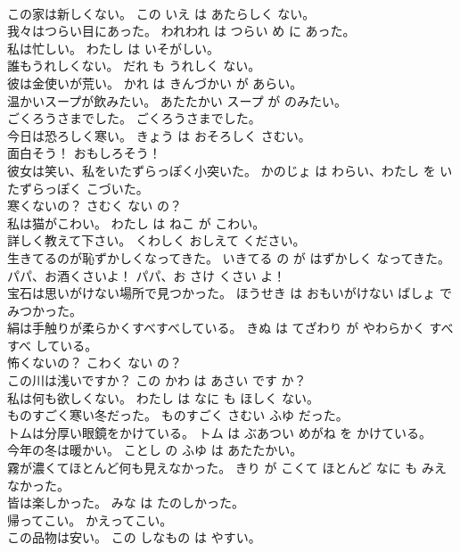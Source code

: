 \documentclass[8pt]{extreport}
\begin{document}
\begin{CJK}{UTF8}{min}
\\	この家は新しくない。	この いえ は あたらしく ない。	
\\	我々はつらい目にあった。	われわれ は つらい め に あった。	
\\	私は忙しい。	わたし は いそがしい。	
\\	誰もうれしくない。	だれ も うれしく ない。	
\\	彼は金使いが荒い。	かれ は きんづかい が あらい。	
\\	温かいスープが飲みたい。	あたたかい スープ が のみたい。	
\\	ごくろうさまでした。	ごくろうさまでした。	
\\	今日は恐ろしく寒い。	きょう は おそろしく さむい。	
\\	面白そう！	おもしろそう！	
\\	彼女は笑い、私をいたずらっぽく小突いた。	かのじょ は わらい、わたし を いたずらっぽく こづいた。	
\\	寒くないの？	さむく ない の？	
\\	私は猫がこわい。	わたし は ねこ が こわい。	
\\	詳しく教えて下さい。	くわしく おしえて ください。	
\\	生きてるのが恥ずかしくなってきた。	いきてる の が はずかしく なってきた。	
\\	パパ、お酒くさいよ！	パパ、お さけ くさい よ！	
\\	宝石は思いがけない場所で見つかった。	ほうせき は おもいがけない ばしょ で みつかった。	
\\	絹は手触りが柔らかくすべすべしている。	きぬ は てざわり が やわらかく すべすべ している。	
\\	怖くないの？	こわく ない の？	
\\	この川は浅いですか？	この かわ は あさい です か？	
\\	私は何も欲しくない。	わたし は なに も ほしく ない。	
\\	ものすごく寒い冬だった。	ものすごく さむい ふゆ だった。	
\\	トムは分厚い眼鏡をかけている。	トム は ぶあつい めがね を かけている。	
\\	今年の冬は暖かい。	ことし の ふゆ は あたたかい。	
\\	霧が濃くてほとんど何も見えなかった。	きり が こくて ほとんど なに も みえなかった。	
\\	皆は楽しかった。	みな は たのしかった。	
\\	帰ってこい。	かえってこい。	
\\	この品物は安い。	この しなもの は やすい。	

\end{CJK}
\end{document}
